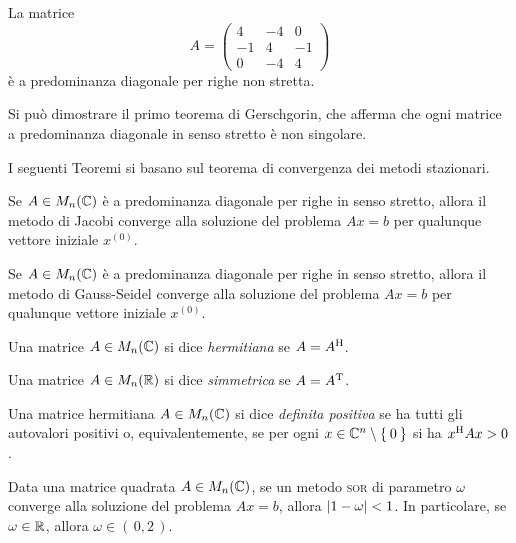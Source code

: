 	\begin{esempio}
		La matrice
		\begin{equation*}
			A =
			\begin{pmatrix}
				4  & -4 & 0  \\
				-1 & 4  & -1 \\
				0  & -4 & 4
			\end{pmatrix}
		\end{equation*}
		è a predominanza diagonale per righe non stretta.
	\end{esempio}

	\begin{osservazione}
		Si può dimostrare il primo teorema di Gerschgorin, che afferma che ogni matrice a predominanza diagonale in senso stretto è non singolare.
	\end{osservazione}
	
	I seguenti Teoremi si basano sul teorema di convergenza dei metodi stazionari.
	
	\begin{teorema}
		Se \(A \in M_n (\mathbb{C})\) è a predominanza diagonale per righe in senso stretto, allora il metodo di Jacobi converge alla soluzione del problema \(A x = b\) per qualunque vettore iniziale \(x^{(0)}\).
	\end{teorema}

	\begin{teorema}
		Se \(A \in M_n (\mathbb{C})\) è a predominanza diagonale per righe in senso stretto, allora il metodo di Gauss-Seidel converge alla soluzione del problema \(A x = b\) per qualunque vettore iniziale \(x^{(0)}\).
	\end{teorema}

	\begin{definizione}
		Una matrice \(A \in M_n (\mathbb{C})\) si dice \emph{hermitiana} se \(A = A^\mathrm{H}\relax\).
		
		Una matrice \(A \in M_n (\mathbb{R})\) si dice \emph{simmetrica} se \(A = A^\mathrm{T}\relax\).
	\end{definizione}

	\begin{definizione}
		Una matrice hermitiana \(A \in M_n (\mathbb{C})\) si dice \emph{definita positiva} se ha tutti gli autovalori positivi o, equivalentemente, se per ogni \(x \in \mathbb{C}^n \setminus \Set{0}\) si ha \(x^\mathrm{H}\relax A x > 0\).
	\end{definizione}

	\begin{teorema}[Kahan]\label{th:kahan}
		Data una matrice quadrata \(A \in M_n (\mathbb{C})\), se un metodo \textsc{sor} di parametro \(\omega\) converge alla soluzione del problema \(A x = b\), allora \(\abs{1 - \omega} < 1\). In particolare, se \(\omega \in \mathbb{R}\), allora \(\omega \in (\, 0, 2 \,)\).
	\end{teorema}

